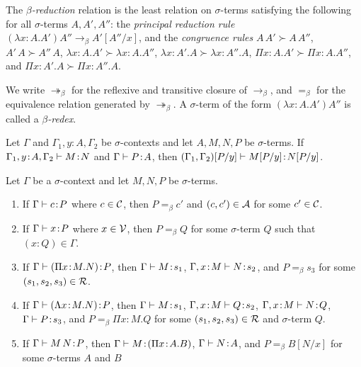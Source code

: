 \documentclass[reqno, twoside]{article}
\begin{document}
    \begin{definition}
        The \textit{$\beta$-reduction} relation is the least relation on $\sigma$-terms satisfying the following for all $\sigma$-terms $A,A',A''$: the \textit{principal reduction rule} $(\lambda x\!:\!A.A')A''\rightarrow_\beta A'[A''/x]$, and the \textit{congruence rules} $A\,A'\succ A\,A''$, $A'\,A\succ A''\,A$, $\lambda x\!:\!A.A'\succ\lambda x\!:\!A.A''$, $\lambda x\!:\!A'.A\succ\lambda x\!:\!A''.A$, $\Pi x\!:\!A.A'\succ\Pi x\!:\!A.A''$, and $\Pi x\!:\!A'.A\succ\Pi x\!:\!A''.A$.
    \end{definition}

    \begin{notation}
        We write $\twoheadrightarrow_\beta$ for the reflexive and transitive closure of $\rightarrow_\beta$, and $=_\beta$ for the equivalence relation generated by $\twoheadrightarrow_\beta$. A $\sigma$-term of the form $(\lambda x\!:\!A.A')A''$ is called a \textit{$\beta$-redex}.
    \end{notation}

    \begin{lemma}\label{lem:substitution}
        Let $\Gamma$ and $\Gamma_1,y\!:\!A,\Gamma_2$ be $\sigma$-contexts and let $A,M,N,P$ be $\sigma$-terms. If $\Gamma_1,y\!:\!A,\Gamma_2\vdash M\!:\!N$ and $\Gamma\vdash P\!:\!A$, then $(\Gamma_1,\Gamma_2)[P/y]\vdash M[P/y]\!:\!N[P/y]$.
    \end{lemma}

    \begin{lemma}\label{lem:stripping}
        Let $\Gamma$ be a $\sigma$-context and let $M,N,P$ be $\sigma$-terms.
        \begin{enumerate}
            \item If $\Gamma\vdash c\!:\!P$ where $c\in\mathcal{C}$, then $P=_\beta c'$ and $(c,c')\in\mathcal{A}$ for some $c'\in\mathcal{C}$.
                \vspace{-0.05in}
            \item If $\Gamma\vdash x\!:\!P$ where $x\in\mathcal{V}$, then $P=_\beta Q$ for some $\sigma$-term $Q$ such that $(x\!:\!Q)\in\Gamma$.
                \vspace{-0.05in}
            \item If $\Gamma\vdash(\Pi x\!:\!M.N)\!:\!P$, then $\Gamma\vdash M\!:\!s_1$, $\Gamma,x\!:\!M\vdash N\!:\!s_2$, and $P=_\beta s_3$ for some $(s_1,s_2,s_3)\in\mathcal{R}$.
                \vspace{-0.05in}
            \item If $\Gamma\vdash(\Lambda x\!:\!M.N)\!:\!P$, then $\Gamma\vdash M\!:\!s_1$, $\Gamma,x\!:\!M\vdash Q\!:\!s_2$, $\Gamma,x\!:\!M\vdash N\!:\!Q$, $\Gamma\vdash P\!:\!s_3$, and $P=_\beta\Pi x\!:\! M.Q$ for some $(s_1,s_2,s_3)\in\mathcal{R}$ and $\sigma$-term $Q$.
                \vspace{-0.05in}
            \item If $\Gamma\vdash M\,N\!:\!P$, then $\Gamma\vdash M\!:\!(\Pi x\!:\!A.B)$, $\Gamma\vdash N\!:\!A$, and $P=_\beta B[N/x]$ for some $\sigma$-terms $A$ and $B$
        \end{enumerate}
    \end{lemma}
\end{document}
